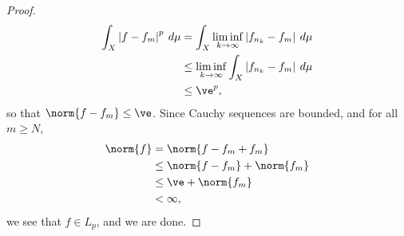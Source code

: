 \documentclass[10pt]{mypackage}
\begin{document}
\begin{proof}
\begin{align*}
    \int_{X}^{} \left\vert f-f_m \right\vert^{p}\:d\mu &= \int_{X}^{} \liminf_{k\rightarrow\infty} \left\vert f_{n_{k}} - f_m \right\vert\:d\mu\\
                                                       &\leq \liminf_{k\rightarrow\infty} \int_{X}^{} \left\vert f_{n_{k}}-f_m \right\vert\:d\mu\\
                                                       &\leq \ve^{p},
  \end{align*}
  so that $\norm{f-f_m} \leq \ve$. Since Cauchy sequences are bounded, and for all $m\geq N$,
  \begin{align*}
    \norm{f} &= \norm{f-f_m + f_m}\\
             &\leq \norm{f-f_m} + \norm{f_m}\\
             &\leq \ve + \norm{f_m}\\
             &< \infty,
  \end{align*}
  we see that $f\in L_p$, and we are done.
\end{proof}
\end{document}

